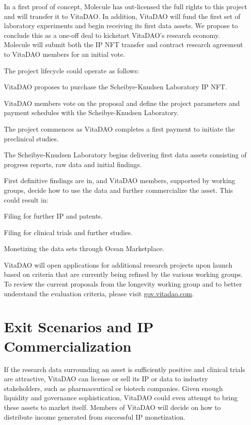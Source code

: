 \documentclass[10pt,letterpaper]{article}
\newenvironment{tight_enumerate}{
\begin{enumerate}
  \setlength{\itemsep}{0pt}
  \setlength{\parskip}{0pt}
}{\end{enumerate}}
\begin{document}
In a first proof of concept, Molecule has out-licensed the full rights to this project and will transfer it to VitaDAO. In addition, VitaDAO will fund the first set of laboratory experiments and begin receiving its first data assets. We propose to conclude this as a one-off deal to kickstart VitaDAO's research economy. Molecule will submit both the IP NFT transfer and contract research agreement to VitaDAO members for an initial vote.

The project lifecycle could operate as follows:

\begin{tight_enumerate}
\item VitaDAO proposes to purchase the Scheibye-Knudsen Laboratory IP NFT.
\item VitaDAO members vote on the proposal and define the project parameters and payment schedules with the Scheibye-Knudsen Laboratory.
\item The project commences as VitaDAO completes a first payment to initiate the preclinical studies.
\item The Scheibye-Knudsen Laboratory begins delivering first data assets consisting of progress reports, raw data and initial findings.
\item First definitive findings are in, and VitaDAO members, supported by working groups, decide how to use the data and further commercialize the asset. This could result in: 
\begin{tight_enumerate}
\item Filing for further IP and patents.
\item Filing for clinical trials and further studies.
\item Monetizing the data sets through Ocean Marketplace.
\end{tight_enumerate}
\end{tight_enumerate}

VitaDAO will open applications for additional research projects upon launch based on criteria that are currently being refined by the various working groups. To review the current proposals from the longevity working group and to better understand the evaluation criteria, please visit \url{gov.vitadao.com}.

\section{Exit Scenarios and IP Commercialization}
If the research data surrounding an asset is sufficiently positive and clinical trials are attractive, VitaDAO can license or sell its IP or data to industry stakeholders, such as pharmaceutical or biotech companies. Given enough liquidity and governance sophistication, VitaDAO could even attempt to bring these assets to market itself. Members of VitaDAO will decide on how to distribute income generated from successful IP monetization. 
\end{document}
